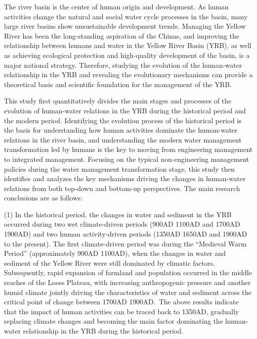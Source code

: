 \begin{eabstract}
  The river basin is the center of human origin and development. As human activities change the natural and social water cycle processes in the basin, many large river basins show unsustainable development trends. Managing the Yellow River has been the long-standing aspiration of the Chinas, and improving the relationship between humans and water in the Yellow River Basin (YRB), as well as achieving ecological protection and high-quality development of the basin, is a major national strategy. 
  Therefore, studying the evolution of the human-water relationship in the YRB and revealing the evolutionary mechanisms can provide a theoretical basis and scientific foundation for the management of the YRB.\

  This study first quantitatively divides the main stages and processes of the evolution of human-water relations in the YRB during the historical period and the modern period. Identifying the evolution process of the historical period is the basis for understanding how human activities dominate the human-water relations in the river basin, and understanding the modern water management transformation led by humans is the key to moving from engineering management to integrated management.
  Focusing on the typical non-engineering management policies during the water management transformation stage, this study then identifies and analyzes the key mechanisms driving the changes in human-water relations from both top-down and bottom-up perspectives. The main research conclusions are as follows:

  (1) In the historical period, the changes in water and sediment in the YRB occurred during two wet climate-driven periods (900AD \textendash{} 1100AD and 1700AD \textendash{} 1900AD) and two human activity-driven periods (1350AD \textendash{} 1650AD and 1900AD to the present). The first climate-driven period was during the ``Medieval Warm Period'' (approximately 900AD \textendash{} 1100AD), when the changes in water and sediment of the Yellow River were still dominated by climatic factors. Subsequently, rapid expansion of farmland and population occurred in the middle reaches of the Loess Plateau, with increasing anthropogenic pressure and another humid climate jointly driving the characteristics of water and sediment across the critical point of change between 1700AD \textendash{} 1900AD.\ The above results indicate that the impact of human activities can be traced back to 1350AD, gradually replacing climate changes and becoming the main factor dominating the human-water relationship in the YRB during the historical period.


\end{eabstract}
